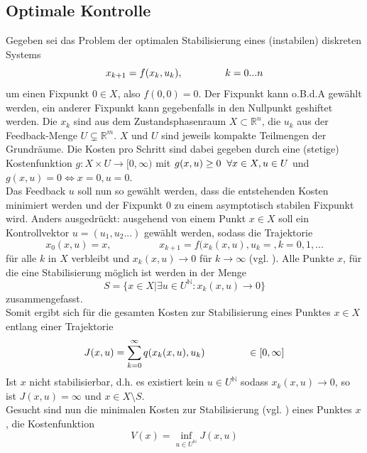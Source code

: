 \documentclass[12pt,a4paper,twoside]{article}
\begin{document}
	\subsection{Optimale Kontrolle}
	Gegeben sei das Problem der optimalen Stabilisierung eines (instabilen) diskreten Systems
	\begin{equation}
		x_{k+1}=f(x_k,u_k), \hspace{1,5cm} k=0...n
	\end{equation}
	um einen Fixpunkt $0\in X$, also $f(0,0)=0$. Der Fixpunkt kann o.B.d.A gewählt werden, ein anderer Fixpunkt kann 
	gegebenfalls in den Nullpunkt geshiftet werden. Die $x_k$ sind aus dem Zustandsphasenraum $X\subset \mathbb{R}^n
	$, die $u_k$ aus der Feedback-Menge $U\subsetneq \mathds{R}^m$. $X$ und $U$ sind jeweils kompakte Teilmengen der 
	Grundräume. Die Kosten pro Schritt sind dabei gegeben durch eine (stetige) Kostenfunktion $g: X\times U
	\rightarrow [0,\infty)$ mit $g(x,u)\geq 0 \hspace{0,2cm}\forall x\in X, u\in U$ und $g(x,u)=0 \Leftrightarrow 
	x=0, u=0$. \\
	Das Feedback $u$ soll nun so gewählt werden, dass die entstehenden Kosten minimiert werden und der Fixpunkt $0$ 
	zu einem asymptotisch stabilen Fixpunkt wird. Anders ausgedrückt: ausgehend von einem Punkt $x\in X$ soll ein
	Kontrollvektor $u=(u_1,u_2...)$ gewählt werden, sodass die Trajektorie 
	\begin{equation*}
		x_0(x,u)=x, \hspace{2cm} x_{k+1}=f(x_k(x,u),u_k=, k=0,1,...
	\end{equation*}
	für alle $k$ in $X$ verbleibt und $x_k(x,u)\rightarrow 0$ für $k\rightarrow\infty$ (vgl. \cite{Grune2005}). Alle Punkte $x$, für die eine Stabilisierung möglich ist werden in der Menge 
	\begin{equation*}
		S=\{x\in X| \exists u\in U^{\mathds{N}}: x_k(x,u)\rightarrow 0\}
	\end{equation*}
	zusammengefasst. \\
	Somit ergibt sich für die gesamten Kosten zur Stabilisierung eines Punktes $x\in X$ entlang einer Trajektorie
	\begin{equation}
		J(x,u)=\sum_{k=0}^{\infty}q(x_k(x,u),u_k) \hspace{1.5cm} \in [0,\infty]
	\end{equation}
	Ist $x$ nicht stabilisierbar, d.h. es existiert kein $u\in U^{\mathds{N}}$ sodass $x_k(x,u)\rightarrow 0$, so ist $J(x,u)=\infty$ und $x\in X\setminus S$. \\
	Gesucht sind nun die minimalen Kosten zur Stabilisierung (vgl. \cite{Junge2004}) eines Punktes $x$, die Kostenfunktion
	\begin{equation}
		\label{eq:valuefunction}
		V(x)=\inf_{u\in U^{\mathds{N}}}J(x,u)
	\end{equation}
\end{document}

